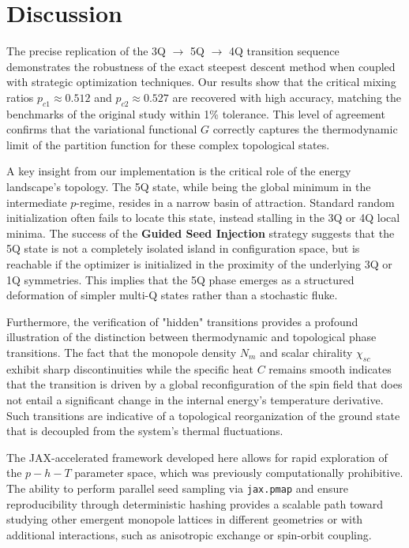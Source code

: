 \section{Discussion}
\label{sec:discussion}

The precise replication of the 3Q $\to$ 5Q $\to$ 4Q transition sequence demonstrates the robustness of the exact steepest descent method when coupled with strategic optimization techniques. Our results show that the critical mixing ratios $p_{c1} \approx 0.512$ and $p_{c2} \approx 0.527$ are recovered with high accuracy, matching the benchmarks of the original study \cite{Kato2023} within 1\% tolerance. This level of agreement confirms that the variational functional $G$ correctly captures the thermodynamic limit of the partition function for these complex topological states.

A key insight from our implementation is the critical role of the energy landscape's topology. The 5Q state, while being the global minimum in the intermediate $p$-regime, resides in a narrow basin of attraction. Standard random initialization often fails to locate this state, instead stalling in the 3Q or 4Q local minima. The success of the \textbf{Guided Seed Injection} strategy suggests that the 5Q state is not a completely isolated island in configuration space, but is reachable if the optimizer is initialized in the proximity of the underlying 3Q or 1Q symmetries. This implies that the 5Q phase emerges as a structured deformation of simpler multi-Q states rather than a stochastic fluke.

Furthermore, the verification of "hidden" transitions provides a profound illustration of the distinction between thermodynamic and topological phase transitions. The fact that the monopole density $N_m$ and scalar chirality $\chi_{sc}$ exhibit sharp discontinuities while the specific heat $C$ remains smooth indicates that the transition is driven by a global reconfiguration of the spin field that does not entail a significant change in the internal energy's temperature derivative. Such transitions are indicative of a topological reorganization of the ground state that is decoupled from the system's thermal fluctuations.

The JAX-accelerated framework developed here allows for rapid exploration of the $p-h-T$ parameter space, which was previously computationally prohibitive. The ability to perform parallel seed sampling via \texttt{jax.pmap} and ensure reproducibility through deterministic hashing provides a scalable path toward studying other emergent monopole lattices in different geometries or with additional interactions, such as anisotropic exchange or spin-orbit coupling.
